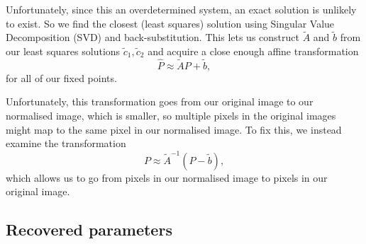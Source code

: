 \documentclass[dvipsnames]{article}
\begin{document}
Unfortunately, since this an overdetermined system, an exact solution is unlikely to exist. So we find the closest (least squares) solution using Singular Value Decomposition (SVD) and back-substitution. This lets us construct $\tilde{A}$ and $\tilde{b}$ from our least squares solutions $\tilde{c}_1, \tilde{c}_2$ and acquire a close enough affine transformation
\[
	\hat{P} \approx \tilde{A}P + \tilde{b},
\]
for all of our fixed points.


Unfortunately, this transformation goes from our original image to our normalised image, which is smaller, so multiple pixels in the original images might map to the same pixel in our normalised image. To fix this, we instead examine the transformation
\[
	P \approx \tilde{A}^{-1}(\hat{P} - \tilde{b}),
\]
which allows us to go from pixels in our normalised image to pixels in our original image.

\newpage

\subsection*{Recovered parameters}
\lstset{style=out}


\newpage
\end{document}
